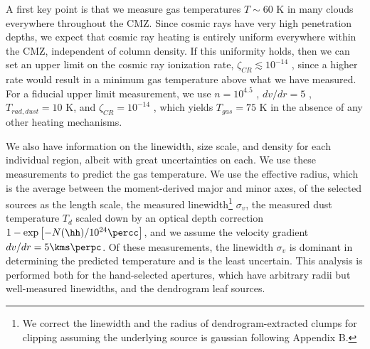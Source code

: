 
A first key point is that we measure gas temperatures $T\sim60$ K in many
clouds everywhere throughout the CMZ.  Since cosmic rays have very high
penetration depths, we expect that cosmic ray heating is entirely uniform
everywhere within the CMZ, independent of column density.  If this uniformity
holds, then we can set an upper limit on the cosmic ray ionization rate,
$\zeta_{CR} \lesssim 10^{-14}$ \pers, since a higher rate would result in a
minimum gas temperature above what we have measured.  
For a fiducial upper limit measurement, we use $n=10^{4.5}$ \percc, $dv/dr=5$
\kms \perpc, $T_{rad,dust}=10$ K, and $\zeta_{CR} = 10^{-14}$ \pers, which
yields $T_{gas}=75$ K in the absence of any other heating mechanisms. 



We also have information on the linewidth, size scale, and density for each
individual region, albeit with great uncertainties on each.  We use these
measurements to predict the gas temperature.  We use the effective radius,
which is the average between the moment-derived major and minor axes, of the
selected sources as the length scale, the measured linewidth\footnote{We correct
the linewidth and the radius of dendrogram-extracted clumps for clipping
assuming the underlying source is gaussian following \citet{Rosolowsky2006a}
Appendix B.}
$\sigma_v$, the
measured dust temperature $T_{d}$ scaled down by an optical depth correction
$1-\exp\left[-N(\hh)/10^{24} \percc\right]$, and we assume the velocity gradient
$dv/dr = 5 \kms \perpc$.  Of these measurements, the linewidth $\sigma_v$ is
dominant in determining the predicted temperature and is the least uncertain.
This analysis is performed both for the hand-selected apertures, which have
arbitrary radii but well-measured linewidths, and the dendrogram leaf sources.

